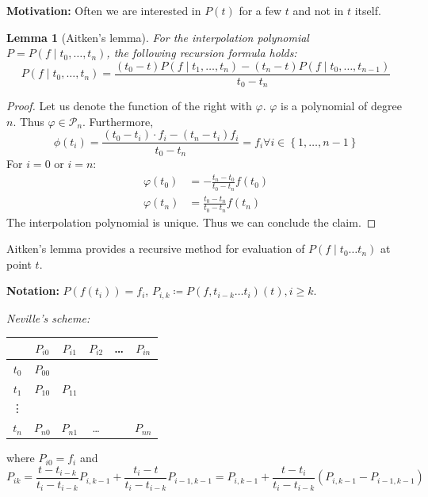 \documentclass[a4paper]{article}
\newcounter{lecref}[section]
\numberwithin{lecref}{section}
\theoremstyle{break}
\newtheorem{lemma}[lecref]{Lemma}
\newcommand{\Set}[1]{\left\{#1\right\}}
\begin{document}
\textbf{Motivation:} Often we are interested in $P(t)$ for a few $t$ and not in $t$ itself.

\begin{lemma}[Aitken's lemma]
  \label{lemma:4-6}
  For the interpolation polynomial $P = P(f \mid t_0, \dots, t_n)$, the following recursion formula holds:
  \[ P(f \mid t_0, \dots, t_n) = \frac{(t_0 - t) P(f \mid t_1, \dots, t_n) - (t_n - t) P(f \mid t_0, \dots, t_{n-1})}{t_0 - t_n} \]
\end{lemma}

\begin{proof}
  Let us denote the function of the right with $\varphi$.
  $\varphi$ is a polynomial of degree $n$.
  Thus $\varphi \in \mathcal P_n$. Furthermore,
  \[ \phi(t_i) = \frac{(t_0 - t_i) \cdot f_i - (t_n - t_i) f_i}{t_0 - t_n} = f_i \forall i \in \Set{1, \dots, n-1} \]
  For $i = 0$ or $i = n$:
  \begin{align*}
    \varphi(t_0) &= -\frac{t_n - t_0}{t_0 - t_n} f(t_0) \\
    \varphi(t_n) &= \frac{t_0 - t_n}{t_0 - t_n} f(t_n)
  \end{align*}
  The interpolation polynomial is unique. Thus we can conclude the claim.
\end{proof}

Aitken's lemma provides a recursive method for evaluation of $P(f \mid t_0 \dots t_n)$ at point $t$.

\textbf{Notation:} $P(f(t_i)) = f_i$, $P_{i,k} \coloneqq P(f, t_{i-k} \dots t_i)(t), i \geq k$.

\emph{Neville's scheme:}
\begin{table}[!ht]
  \begin{center}
    \begin{tabular}{c|ccccc}
            & $P_{i0}$ & $P_{i1}$ & $P_{i2}$ & \dots & $P_{in}$ \\
    \hline
      $t_0$ & $P_{00}$ &          &          &       &          \\
      $t_1$ & $P_{10}$ & $P_{11}$ &          &       &          \\
      \vdots &         &          &          &       &          \\
      $t_n$ & $P_{n0}$ & $P_{n1}$ &  \dots   &       & $P_{nn}$
    \end{tabular}
  \end{center}
\end{table}
where $P_{i0} = f_i$ and
\[ P_{ik} = \frac{t - t_{i-k}}{t_i - t_{i-k}} P_{i, k-1} + \frac{t_i - t}{t_i - t_{i-k}} P_{i-1,k-1} = P_{i,k-1} + \frac{t - t_i}{t_i - t_{i-k}} (P_{i,k-1} - P_{i-1,k-1}) \]
\end{document}
